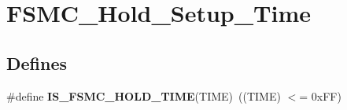 \hypertarget{group__FSMC__Hold__Setup__Time}{
\section{FSMC\_\-Hold\_\-Setup\_\-Time}
\label{group__FSMC__Hold__Setup__Time}
}
\subsection*{Defines}
\begin{DoxyCompactItemize}
\item 
\hypertarget{group__FSMC__Hold__Setup__Time_gab2abc8eb967495f2a2bafec8162d6385}{
\#define {\bfseries IS\_\-FSMC\_\-HOLD\_\-TIME}(TIME)~((TIME) $<$= 0xFF)}
\label{group__FSMC__Hold__Setup__Time_gab2abc8eb967495f2a2bafec8162d6385}

\end{DoxyCompactItemize}
